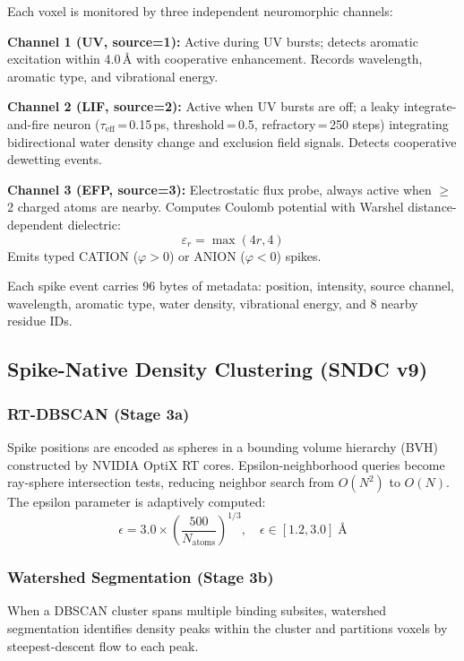 \documentclass[11pt,twocolumn]{article}
\begin{document}
Each voxel is monitored by three independent neuromorphic channels:

\textbf{Channel 1 (UV, source=1):} Active during UV bursts; detects aromatic excitation
within 4.0\,\AA{} with cooperative enhancement. Records wavelength, aromatic type, and
vibrational energy.

\textbf{Channel 2 (LIF, source=2):} Active when UV bursts are off; a leaky integrate-and-fire
neuron ($\tau_{\text{eff}}$\,=\,0.15\,ps, threshold\,=\,0.5, refractory\,=\,250 steps)
integrating bidirectional water density change and exclusion field signals. Detects
cooperative dewetting events.

\textbf{Channel 3 (EFP, source=3):} Electrostatic flux probe, always active when $\geq$2
charged atoms are nearby. Computes Coulomb potential with Warshel distance-dependent
dielectric:
\begin{equation}
  \varepsilon_r = \max(4r, 4)
  \label{eq:warshel}
\end{equation}
Emits typed CATION ($\varphi > 0$) or ANION ($\varphi < 0$) spikes.

Each spike event carries 96 bytes of metadata: position, intensity, source channel,
wavelength, aromatic type, water density, vibrational energy, and 8 nearby residue IDs.

\subsection{Spike-Native Density Clustering (SNDC v9)}

\subsubsection{RT-DBSCAN (Stage 3a)}
Spike positions are encoded as spheres in a bounding volume hierarchy (BVH) constructed by
NVIDIA OptiX RT cores. Epsilon-neighborhood queries become ray-sphere intersection tests,
reducing neighbor search from $O(N^2)$ to $O(N)$. The epsilon parameter is adaptively
computed:
\begin{equation}
  \epsilon = 3.0 \times \left(\frac{500}{N_{\text{atoms}}}\right)^{1/3}, \quad
  \epsilon \in [1.2, 3.0] \; \text{\AA}
  \label{eq:adaptive_eps}
\end{equation}

\subsubsection{Watershed Segmentation (Stage 3b)}
When a DBSCAN cluster spans multiple binding subsites, watershed segmentation identifies
density peaks within the cluster and partitions voxels by steepest-descent flow to each peak.
\end{document}
